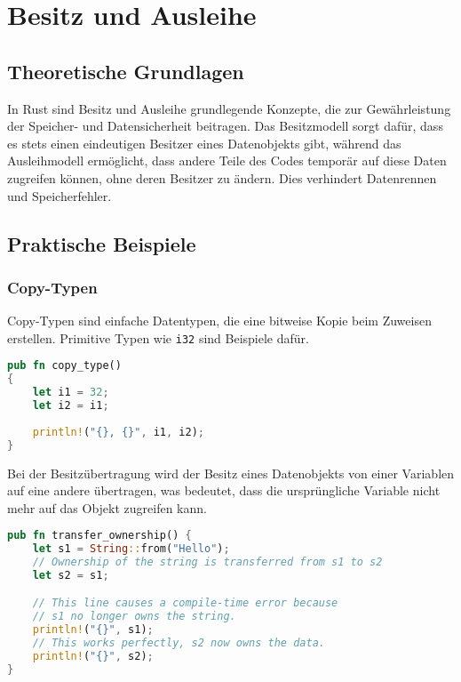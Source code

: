 \chapter{Besitz und Ausleihe}

\section{Theoretische Grundlagen}

In Rust sind Besitz und Ausleihe grundlegende Konzepte, die zur Gewährleistung der Speicher- und Datensicherheit beitragen. Das Besitzmodell sorgt dafür, dass es stets einen eindeutigen Besitzer eines Datenobjekts gibt, während das Ausleihmodell ermöglicht, dass andere Teile des Codes temporär auf diese Daten zugreifen können, ohne deren Besitzer zu ändern. Dies verhindert Datenrennen und Speicherfehler.

\section{Praktische Beispiele}

\subsection{Copy-Typen}
Copy-Typen sind einfache Datentypen, die eine bitweise Kopie beim Zuweisen erstellen. Primitive Typen wie \texttt{i32} sind Beispiele dafür.

\begin{lstlisting}[language=Rust, caption=Copy-Typen Beispiel]
pub fn copy_type() 
{
    let i1 = 32;
    let i2 = i1;
    
    println!("{}, {}", i1, i2);
}
\end{lstlisting}

Bei der Besitzübertragung wird der Besitz eines Datenobjekts von einer Variablen auf eine andere übertragen, was bedeutet, dass die ursprüngliche Variable nicht mehr auf das Objekt zugreifen kann.

\begin{lstlisting}[language=Rust, caption=Unveränderliche Ausleihe Beispiel]
pub fn transfer_ownership() {
    let s1 = String::from("Hello");
    // Ownership of the string is transferred from s1 to s2
    let s2 = s1;  

    // This line causes a compile-time error because 
    // s1 no longer owns the string.
    println!("{}", s1); 
    // This works perfectly, s2 now owns the data.
    println!("{}", s2); 
}
\end{lstlisting}
\cleardoublepage
